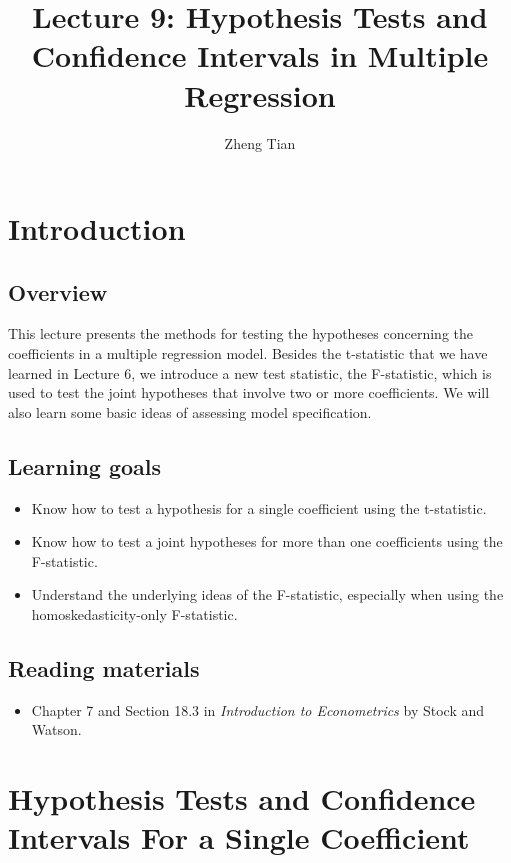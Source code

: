 \documentclass[a4paper,11pt]{article}
\author{Zheng Tian}
\date{}
\title{Lecture 9: Hypothesis Tests and Confidence Intervals in Multiple Regression}
\begin{document}
\maketitle

\section{Introduction}
\label{sec:org8e6f23f}

\subsection{Overview}
\label{sec:orge457453}
This lecture presents the methods for testing the hypotheses
concerning the coefficients in a multiple regression model. Besides
the t-statistic that we have learned in Lecture 6, we introduce a new
test statistic, the F-statistic, which is used to test the joint
hypotheses that involve two or more coefficients. We will also learn
some basic ideas of assessing model specification.


\subsection{Learning goals}
\label{sec:org1619175}
\begin{itemize}
\item Know how to test a hypothesis for a single coefficient using the
t-statistic.
\item Know how to test a joint hypotheses for more than one coefficients
using the F-statistic.
\item Understand the underlying ideas of the F-statistic, especially when
using the homoskedasticity-only F-statistic.
\end{itemize}


\subsection{Reading materials}
\label{sec:orgc0bacb5}
\begin{itemize}
\item Chapter 7 and Section 18.3 in \emph{Introduction to Econometrics} by
Stock and Watson.
\end{itemize}


\section{Hypothesis Tests and Confidence Intervals For a Single Coefficient}
\label{sec:org64fcf86}
\end{document}
